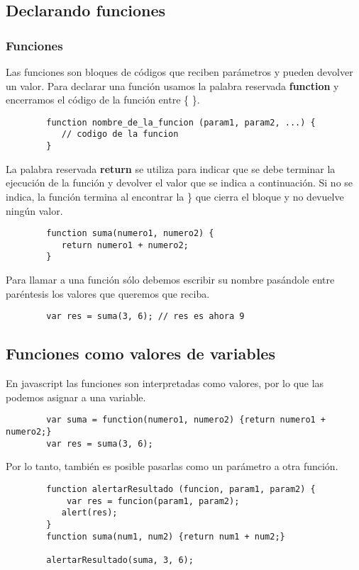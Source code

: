 \documentclass[handout, 10pt]{beamer}
\begin{document}
\subsection{Declarando funciones}
\begin{frame}[fragile]
	\frametitle{Funciones}
	Las funciones son bloques de códigos que reciben parámetros y pueden devolver un valor. Para declarar una función usamos
	la palabra reservada \textbf{function} y encerramos el código de la función entre \{ \}.
	
	\begin{lstlisting}
		function nombre_de_la_funcion (param1, param2, ...) {
		   // codigo de la funcion
		}
	\end{lstlisting}
	
	\pause
	
	La palabra reservada \textbf{return} se utiliza para indicar que se debe terminar la ejecución de la función 
	y devolver el valor que se indica a continuación. Si no se indica, la función termina al encontrar la \} que
	cierra el bloque y no devuelve ningún valor.
	
	\begin{lstlisting}
		function suma(numero1, numero2) {
		   return numero1 + numero2;
		}
	\end{lstlisting}
	
	\pause
	
	Para llamar a una función sólo debemos escribir su nombre pasándole entre paréntesis los valores que queremos que
	reciba.
	
	\begin{lstlisting}
		var res = suma(3, 6); // res es ahora 9
	\end{lstlisting}
\end{frame}

\subsection{Funciones como valores de variables}
\begin{frame}[fragile]
	En javascript las funciones son interpretadas como valores, por lo que las podemos asignar a una variable.
	
	\begin{lstlisting}
		var suma = function(numero1, numero2) {return numero1 + numero2;}
		var res = suma(3, 6);
	\end{lstlisting}
	
	\pause
	
	Por lo tanto, también es posible pasarlas como un parámetro a otra función.
	
	\begin{lstlisting}
		function alertarResultado (funcion, param1, param2) {
			var res = funcion(param1, param2);
		   alert(res);
		}
		function suma(num1, num2) {return num1 + num2;}
		
		alertarResultado(suma, 3, 6);
	\end{lstlisting}
\end{frame}
\end{document}

